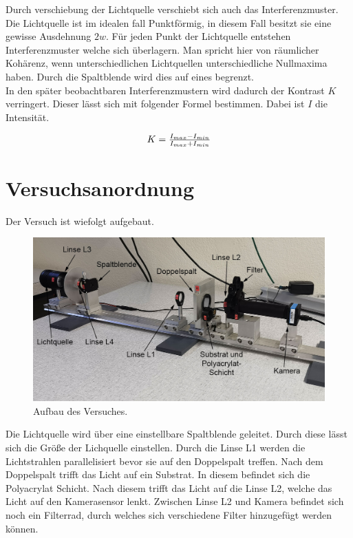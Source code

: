 \documentclass[12pt,a4paper,twoside]{article}
\begin{document}
\noindent
Durch verschiebung der Lichtquelle verschiebt sich auch das Interferenzmuster. Die Lichtquelle ist im idealen fall Punktförmig, in diesem Fall besitzt sie eine gewisse Ausdehnung $2w$. 
Für jeden Punkt der Lichtquelle entstehen Interferenzmuster welche sich überlagern. Man spricht hier von räumlicher Kohärenz, wenn unterschiedlichen Lichtquellen unterschiedliche Nullmaxima haben. 
Durch die Spaltblende wird dies auf eines begrenzt. \\
In den später beobachtbaren Interferenzmustern wird dadurch der Kontrast $K$ verringert. Dieser lässt sich mit folgender Formel bestimmen. Dabei ist $I$ die Intensität. 

\begin{equation}
    \label{eq:Kontrast}
    \centerline{$K = \frac{I_{max} - I_{min}}{I_{max} + I_{min}} $}%
\end{equation}


\section{Versuchsanordnung} %
Der Versuch ist wiefolgt aufgebaut. 

\begin{figure}[H]
    \centering
    \includegraphics[width=0.6\linewidth]{nudes/aufbau.jpg}
    \caption{Aufbau des Versuches.}
    \label{fig:aufbau}
\end{figure}

\noindent
Die Lichtquelle wird über eine einstellbare Spaltblende geleitet. Durch diese lässt sich die Größe der Lichquelle einstellen. 
Durch die Linse L1 werden die Lichtstrahlen parallelisiert bevor sie auf den Doppelspalt treffen. 
Nach dem Doppelspalt trifft das Licht auf ein Substrat. In diesem befindet sich die Polyacrylat Schicht. 
Nach diesem trifft das Licht auf die Linse L2, welche das Licht auf den Kamerasensor lenkt. Zwischen Linse L2 und Kamera befindet sich noch ein Filterrad, durch welches sich verschiedene Filter hinzugefügt werden können. 
\end{document}
